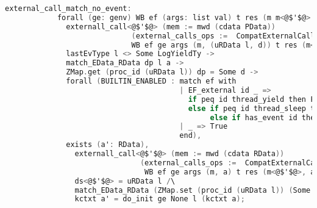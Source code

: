          
\begin{lstlisting}[language=C]     
          external_call_match_no_event:
            forall (ge: genv) WB ef (args: list val) t res (m m<@$'$@> : mem) l d d<@$'$@> ds<@$'$@> (dp : EData) (a: RData),
              externall_call<@$'$@> (mem := mwd (cdata PData)) 
                             (external_calls_ops :=  CompatExternalCalls.compatlayer_extcall_ops (LH <@$\oplus$@> L64))
                             WB ef ge args (m, (uRData l, d)) t res (m<@$'$@>, (ds<@$'$@>, d<@$'$@>)) ->
              lastEvType l <> Some LogYieldTy ->
              match_EData_RData dp l a ->
              ZMap.get (proc_id (uRData l)) dp = Some d ->
              forall (BUILTIN_ENABLED : match ef with
                                        | EF_external id _ => 
                                          if peq id thread_yield then False
                                          else if peq id thread_sleep then False
                                               else if has_event id then False else True
                                        | _ => True
                                        end),
              exists (a': RData),
                externall_call<@$'$@> (mem := mwd (cdata RData)) 
                               (external_calls_ops :=  CompatExternalCalls.compatlayer_extcall_ops (pbthread  <@$\oplus$@>  L64))
                                WB ef ge args (m, a) t res (m<@$'$@>, a') /\
                ds<@$'$@> = uRData l /\
                match_EData_RData (ZMap.set (proc_id (uRData l)) (Some d<@$'$@>) dp) l a' /\
                kctxt a' = do_init ge None l (kctxt a);
\end{lstlisting}
         
